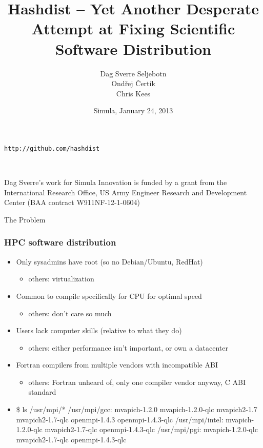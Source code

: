 \documentclass[sans,mathserif]{beamer}
\title{Hashdist -- Yet Another Desperate Attempt at Fixing Scientific Software Distribution}
\author{Dag Sverre Seljebotn\\Ond\v{r}ej \v{C}ert\'{i}k\\Chris Kees}
\date{Simula, January 24, 2013}
\begin{document}
\begin{frame}
  \titlepage

  \begin{center} {\tt http://github.com/hashdist}
  \end{center}
~

{\footnotesize

Dag Sverre's work for Simula Innovation is funded by a grant from the \\
International Research Office, US Army Engineer Research and Development Center
(BAA contract W911NF-12-1-0604)
}

\end{frame}

\begin{frame}
  \begin{center}
    {\LARGE The Problem}
  \end{center}
\end{frame}


\begin{frame}[fragile]
  \frametitle{HPC software distribution}
  \begin{itemize}
  \item<+-> Only sysadmins have root (so no Debian/Ubuntu, RedHat)
    \begin{itemize}
    \item others: virtualization
    \end{itemize}
  \item<+-> Common to compile specifically for CPU for optimal speed
    \begin{itemize}
    \item others: don't care so much
    \end{itemize}
  \item<+-> Users lack computer skills (relative to what they do)
    \begin{itemize}
    \item others: either performance isn't important, or own a datacenter
    \end{itemize}
  \item<+-> Fortran compilers from multiple vendors with incompatible ABI
    \begin{itemize}
    \item others: Fortran unheard of, only one compiler vendor anyway, C ABI standard
    \end{itemize}
\item<+->
{\small
  \begin{semiverbatim}
\$ ls /usr/mpi/*
/usr/mpi/gcc:
mvapich-1.2.0  mvapich-1.2.0-qlc  mvapich2-1.7
mvapich2-1.7-qlc  openmpi-1.4.3  openmpi-1.4.3-qlc
/usr/mpi/intel:
mvapich-1.2.0-qlc  mvapich2-1.7-qlc  openmpi-1.4.3-qlc
/usr/mpi/pgi:
mvapich-1.2.0-qlc  mvapich2-1.7-qlc  openmpi-1.4.3-qlc
  \end{semiverbatim}
}
\end{itemize}
\end{frame}
\end{document}
